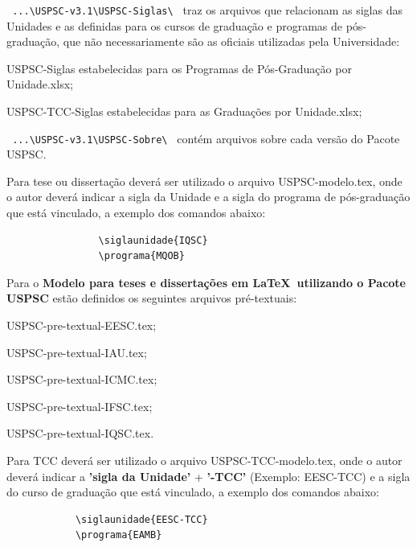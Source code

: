 \begin{alineas}
	\item \verb+ ...\USPSC-v3.1\USPSC-Siglas\ + traz os arquivos que relacionam as siglas das Unidades e as definidas para os cursos de graduação e programas de pós-graduação, que não necessariamente são as oficiais utilizadas pela Universidade: 
		\begin{alineas}	
			\item USPSC-Siglas estabelecidas para os Programas de Pós-Graduação por Unidade.xlsx;
			\item USPSC-TCC-Siglas estabelecidas para as Graduações por Unidade.xlsx;
		\end{alineas}
		
	\item \verb+ ...\USPSC-v3.1\USPSC-Sobre\ + cont\'em arquivos sobre cada versão do Pacote USPSC.

\end{alineas}	 

		
Para tese ou dissertação dever\'a ser utilizado o arquivo USPSC-modelo.tex, onde o autor dever\'a indicar a sigla da Unidade e a sigla do programa de pós-graduação que est\'a vinculado, a exemplo dos comandos abaixo:
		
			\begin{verbatim}
				\siglaunidade{IQSC}
				\programa{MQOB}
			\end{verbatim}
			
Para o \textbf{Modelo para teses e dissertações em \LaTeX\ utilizando o Pacote USPSC} estão definidos os seguintes arquivos pr\'e-textuais:
			
			\begin{alineas}	 
				\item USPSC-pre-textual-EESC.tex;
				\item USPSC-pre-textual-IAU.tex;
				\item USPSC-pre-textual-ICMC.tex;
				\item USPSC-pre-textual-IFSC.tex;
				\item USPSC-pre-textual-IQSC.tex.
			\end{alineas}
			
Para TCC dever\'a ser utilizado o arquivo USPSC-TCC-modelo.tex, onde o autor dever\'a indicar a \textbf{'sigla da Unidade'} + \textbf{'-TCC'} (Exemplo: EESC-TCC) e a sigla do curso de graduação que est\'a vinculado, a exemplo dos comandos abaixo:
			
			\begin{verbatim}
			\siglaunidade{EESC-TCC}
			\programa{EAMB}
			\end{verbatim}
			
